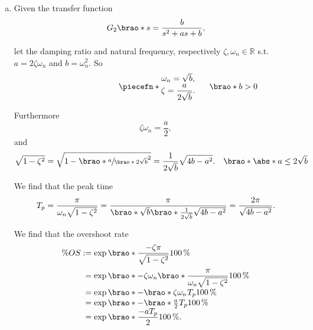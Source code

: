\documentclass[12pt]{article}
\DeclarePairedDelimiter\brao()%
\DeclarePairedDelimiter\abs||
\DeclarePairedDelimiter\piecefn\{.
\begin{document}
\begin{enumerate}[(a)]
    \item
        Given the transfer function
        \begin{equation}
            G_2\brao*s = \frac{b}{s^2 + as + b},
        \end{equation}
        
        let the damping ratio and natural frequency, respectively $\zeta, \omega_n \in \mathbb{R}$ s.t. $a = 2\zeta\omega_n$ and $b = \omega_n^2$. So
        \begin{equation}
            \piecefn*{
                \begin{matrix}
                    \omega_n = \sqrt{b}\rlap, \\*
                    \zeta = \dfrac{a}{2\sqrt{b}}\rlap. \\*
                \end{matrix}
            }\rlap{$\qquad\brao*{b > 0}$}
        \end{equation}

        Furthermore
        \begin{equation}
            \zeta\omega_n = \frac{a}2,
        \end{equation}
        and
        \begin{equation}
            \sqrt{1 - \zeta^2} = \sqrt{1 - \brao*{\sfrac{a}{\brao*{2\sqrt{b}}}}^2} = \frac{1}{2\sqrt{b}} \sqrt{4b - a^2}.%
            \hskip1em\brao*{\abs*{a} \leq 2\sqrt{b}}
        \end{equation}
        
        We find that the peak time
        \begin{equation}\label{eq:peak time}
            T_p = \frac\pi{\omega_n \sqrt{1 - \zeta^2}} = \frac\pi{\brao*{\sqrt{b}}\brao*{ \frac{1}{2\sqrt{b}}\sqrt{4b - a^2}}} = \frac{2\pi}{\sqrt{4b - a^2}}.
        \end{equation}

        We find that the overshoot rate
        \begin{equation}\label{eq:overshoot}
            \begin{array}{*2{@{}r}@{}l@{}}
                \% OS
                &{}:={}& \exp\brao*{\dfrac{-\zeta\pi}{\sqrt{1 - \zeta^2}}} \SI{100}\percent
            \\*[1.3em]
                &{}={}& \exp\brao*{-\zeta\omega_n\brao*{\dfrac{\pi}{\omega_n\sqrt{1 - \zeta^2}}}} \SI{100}\percent
            \\*
                &{}={}& \exp\brao*{-\brao*{\zeta\omega_n}^{\vphantom{1}}T_p} \SI{100}\percent
            \\*
                &{}={}& \exp\brao*{-\brao*{\tfrac{a}2}^{\vphantom{1}}T_p} \SI{100}\percent
            \\*
                & {}={} & \exp\brao*{\dfrac{-aT_p}{2}} \SI{100}\percent\rlap.
            \\*
            \end{array}
        \end{equation}


\end{enumerate}
\end{document}

